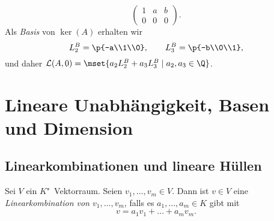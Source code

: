 \documentclass[a4paper]{article}
\begin{document}
\begin{example}
\begin{enumerate}[{Fall~}1, leftmargin=*]
        \begin{equation*}
            \begin{pmatrix}
                1 & a & b \\
                0 & 0 & 0
            \end{pmatrix}.
        \end{equation*}
        Als \emph{Basis} von $\ker(A)$ erhalten wir
        \begin{equation*}
            L_2^B = \p{-a\\1\\0},\qquad L_3^B = \p{-b\\0\\1},
        \end{equation*}
        und daher $\mathcal{L}(A, 0) = \mset{a_2L_2^B + a_3L_3^B \mid a_2,a_3 \in \Q}$.
    \end{enumerate}
\end{example}


\section{Lineare Unabhängigkeit, Basen und Dimension}

\subsection{Linearkombinationen und lineare Hüllen}

\begin{definition}[Linearkombination]
    Sei $V$ ein $K$"~Vektorraum. Seien $v_1,\dots,v_m \in V$. Dann ist $v \in V$ eine \emph{Linearkombination von $v_1,\dots,v_m$}, falls es $a_1,\dots,a_m \in K$ gibt mit
    \begin{equation*}
        v = a_1v_1 + \dots + a_mv_m.
    \end{equation*}
\end{definition}
\end{document}
